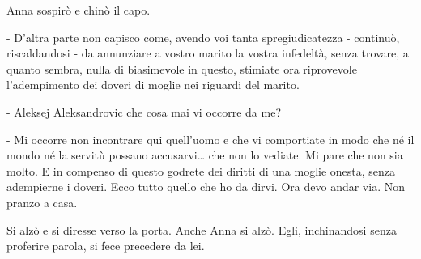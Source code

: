 Anna sospirò e chinò il capo. 

- D'altra parte non capisco come, avendo voi tanta spregiudicatezza - continuò, riscaldandosi - da annunziare a vostro marito la vostra infedeltà, senza trovare, a quanto sembra, nulla di biasimevole in questo, stimiate ora riprovevole l'adempimento dei doveri di moglie nei riguardi del marito. 

- Aleksej Aleksandrovic che cosa mai vi occorre da me? 

- Mi occorre non incontrare qui quell'uomo e che vi comportiate in modo che né il mondo né la servitù possano accusarvi\ldots{} che non lo vediate. Mi pare che non sia molto. E in compenso di questo godrete dei diritti di una moglie onesta, senza adempierne i doveri. Ecco tutto quello che ho da dirvi. Ora devo andar via. Non pranzo a casa. 

Si alzò e si diresse verso la porta. Anche Anna si alzò. Egli, inchinandosi senza proferire parola, si fece precedere da lei. 

